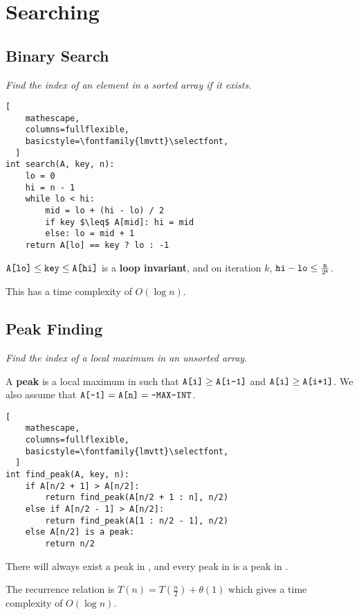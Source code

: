 \section{Searching}

\subsection{Binary Search}
\emph{Find the index of an element in a sorted array if it exists.}

\begin{lstlisting}[
    mathescape,
    columns=fullflexible,
    basicstyle=\fontfamily{lmvtt}\selectfont,
  ]
int search(A, key, n):
    lo = 0
    hi = n - 1
    while lo < hi:
        mid = lo + (hi - lo) / 2
        if key $\leq$ A[mid]: hi = mid
        else: lo = mid + 1
    return A[lo] == key ? lo : -1 
\end{lstlisting}

$\texttt{A[lo]} \leq \texttt{key} \leq \texttt{A[hi]}$ is a \textbf{loop invariant},
and on iteration $k$, $\texttt{hi} - \texttt{lo} \leq \frac{\texttt{n}}{2^{\texttt{k}}}$.

This has a time complexity of $O(\log n)$.

\subsection{Peak Finding}
\emph{Find the index of a local maximum in an unsorted array.}

A \textbf{peak} is a local maximum in  such that $\texttt{A[i]} \geq \texttt{A[i-1]}$ and $\texttt{A[i]} \geq \texttt{A[i+1]}$.
We also assume that $\texttt{A[-1]} = \texttt{A[n]} = \texttt{-MAX-INT}$.

\begin{lstlisting}[
    mathescape,
    columns=fullflexible,
    basicstyle=\fontfamily{lmvtt}\selectfont,
  ]
int find_peak(A, key, n):
    if A[n/2 + 1] > A[n/2]:
        return find_peak(A[n/2 + 1 : n], n/2)
    else if A[n/2 - 1] > A[n/2]:
        return find_peak(A[1 : n/2 - 1], n/2)
    else A[n/2] is a peak:
        return n/2
\end{lstlisting}

There will always exist a peak in , and every peak in  is a peak in .

The recurrence relation is $T(n) = T(\frac{n}{2}) + \theta(1)$ which gives a time complexity of $O(\log n)$.